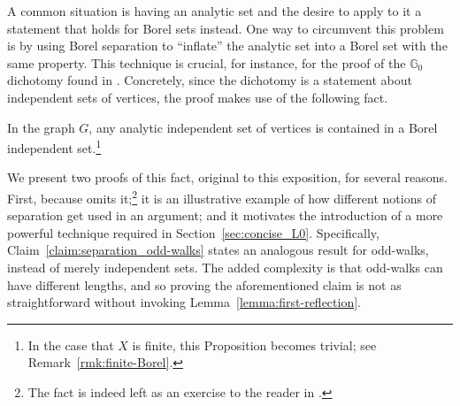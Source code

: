 A common situation is having an analytic set and the desire to apply to it a statement that holds for Borel sets instead.
One way to circumvent this problem is by using Borel separation to ``inflate'' the analytic set into a Borel set with the same property.
This technique is crucial, for instance, for the proof of the $\mathbb{G}_0$ dichotomy found in \cite{Bernshteyn2024}.
Concretely, since the dichotomy is a statement about independent sets of vertices, the proof makes use of the following fact.

\begin{proposition}\label{prop:indep-analyitc-borel}
    In the graph $G$, any analytic independent set of vertices is contained in a Borel independent set.\footnote{In the case that $X$ is finite, this Proposition becomes trivial; see Remark~\ref{rmk:finite-Borel}.}
\end{proposition}

We present two proofs of this fact, original to this exposition, for several reasons.
First, because \cite{Bernshteyn2024} omits it;\footnote{The fact is indeed left as an exercise to the reader in \cite{Bernshteyn2024}.} it is an illustrative example of how different notions of separation get used in an argument; and it motivates the introduction of a more powerful technique required in Section~\ref{sec:concise_L0}.
Specifically, Claim~\ref{claim:separation_odd-walks} states an analogous result for odd-walks, instead of merely independent sets.
The added complexity is that odd-walks can have different lengths, and so proving the aforementioned claim is not as straightforward without invoking Lemma~\ref{lemma:first-reflection}.

